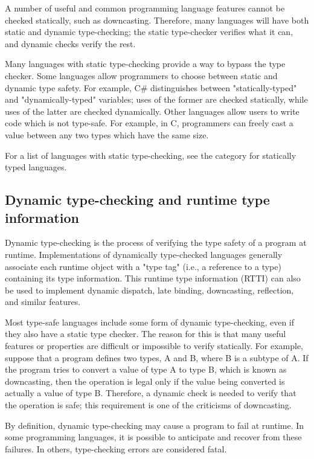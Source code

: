 \documentclass[12pt,b5paper]{book}
\theoremstyle{definition}
\begin{document}
A number of useful and common programming language features cannot be checked statically, such as downcasting. Therefore, many languages will have both static and dynamic type-checking; the static type-checker verifies what it can, and dynamic checks verify the rest.

Many languages with static type-checking provide a way to bypass the type checker. Some languages allow programmers to choose between static and dynamic type safety. For example, C\# distinguishes between "statically-typed" and "dynamically-typed" variables; uses of the former are checked statically, while uses of the latter are checked dynamically. Other languages allow users to write code which is not type-safe. For example, in C, programmers can freely cast a value between any two types which have the same size.

For a list of languages with static type-checking, see the category for statically typed languages.


\subsection{Dynamic type-checking and runtime type information}

Dynamic type-checking is the process of verifying the type safety of a program at runtime. Implementations of dynamically type-checked languages generally associate each runtime object with a "type tag" (i.e., a reference to a type) containing its type information. This runtime type information (RTTI) can also be used to implement dynamic dispatch, late binding, downcasting, reflection, and similar features.

Most type-safe languages include some form of dynamic type-checking, even if they also have a static type checker. The reason for this is that many useful features or properties are difficult or impossible to verify statically. For example, suppose that a program defines two types, A and B, where B is a subtype of A. If the program tries to convert a value of type A to type B, which is known as downcasting, then the operation is legal only if the value being converted is actually a value of type B. Therefore, a dynamic check is needed to verify that the operation is safe; this requirement is one of the criticisms of downcasting.

By definition, dynamic type-checking may cause a program to fail at runtime. In some programming languages, it is possible to anticipate and recover from these failures. In others, type-checking errors are considered fatal.
\end{document}
